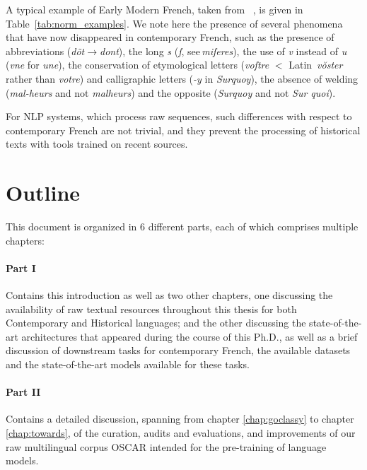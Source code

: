 A typical example of Early Modern French, taken from ~\citet{balzac-1624-lettres}, is given in Table~\ref{tab:norm_examples}. We note here the presence of several phenomena that have now disappeared in contemporary French, such as the presence of abbreviations (\emph{dõt}$\to$\emph{dont}), the long \emph{s} (\emph{ſ}, see\,\emph{miſeres}), the use of \emph{v} instead of \emph{u} (\emph{vne} for \emph{une}), the conservation of etymological letters (\emph{voſtre} $<$ Latin~\emph{vŏster} rather than \emph{votre}) and calligraphic letters (\emph{-y} in \emph{Surquoy}), the absence of welding  (\emph{\mbox{mal-heurs}} and not \emph{malheurs}) and the opposite (\emph{Surquoy} and not \emph{Sur quoi}).

For NLP systems, which process raw sequences, such differences with respect to contemporary French are not trivial, and they prevent the processing of historical texts with tools trained on recent sources.

\section{Outline}

This document is organized in 6 different parts, each of which comprises multiple chapters:

\paragraph{Part I} Contains this introduction as well as two other chapters, one discussing the availability of raw textual resources throughout this thesis for both Contemporary and Historical languages; and the other discussing the state-of-the-art architectures that appeared during the course of this Ph.D., as well as a brief discussion of downstream tasks for contemporary French, the available datasets and the state-of-the-art models available for these tasks.

\paragraph{Part II} Contains a detailed discussion, spanning from chapter \ref{chap:goclassy} to chapter \ref{chap:towards}, of the curation, audits and evaluations, and improvements of our raw multilingual corpus OSCAR \citep{ortiz-suarez-etal-2019-asynchronous,ortiz-suarez-etal-2020-monolingual,abadji-etal-2021-ungoliant,abadji-etal-2022-towards} intended for the pre-training of language models.

